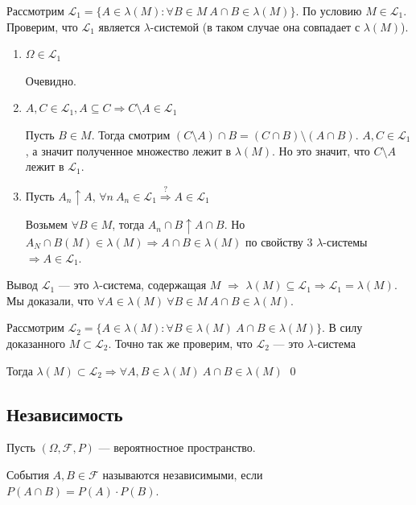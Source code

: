 Рассмотрим \( \mathcal{L}_1 = \{ A \in \lambda(M) : \forall B \in M \ A \cap B \in \lambda(M) \} \).
По условию \( M \in \mathcal{L}_1 \).
Проверим, что \( \mathcal{L}_1 \) является \( \lambda \)-системой
(в таком случае она совпадает с \( \lambda(M) \)).
\begin{enumerate}
    \item
        \( \Omega \in \mathcal{L}_1 \)

        Очевидно.
    \item
        \( A, C \in \mathcal{L}_1, A \subseteq C \Rightarrow C \setminus A \in \mathcal{L}_1 \)

        Пусть \( B \in M \).
        Тогда смотрим \( ( C \setminus A) \cap B = (C \cap B) \setminus (A \cap B) \).
        \( A, C \in \mathcal{L_1} \),
        а значит полученное множество лежит в \( \lambda(M) \).
        Но это значит, что \( C \setminus A \) лежит в \( \mathcal{L}_1 \).
    \item
        Пусть \( A_n \uparrow A \), \( \forall n \ A_n \in \mathcal{L_1} \overset{?}{\Rightarrow} A \in \mathcal{L}_1 \)

        Возьмем \( \forall B \in M \),
        тогда \( A_n \cap B \uparrow A \cap B \).
        Но \( A_N \cap B(M) \in \lambda(M) \Rightarrow A \cap B \in \lambda(M) \)
        по свойству \( 3 \) \( \lambda \)-системы \( \Rightarrow A \in \mathcal{L}_1 \).
\end{enumerate}

Вывод \( \mathcal{L}_1 \) --- это \( \lambda \)-система,
содержащая \( M \) \( \Rightarrow \) \( \lambda(M) \subseteq \mathcal{L}_1 \Rightarrow \mathcal{L}_1 = \lambda(M) \).
Мы доказали, что \( \forall A \in \lambda (M) \ \forall B \in M \ A \cap B \in \lambda(M) \).

Рассмотрим \( \mathcal{L}_2 = \{ A \in \lambda(M) : \forall B \in \lambda(M) \ A \cap B \in \lambda(M) \} \).
В силу доказанного \( M \subset \mathcal{L}_2 \). Точно так же проверим, что \( \mathcal{L}_2 \) --- это
\( \lambda \)-система


Тогда \( \lambda(M) \subset \mathcal{L}_2 \Rightarrow \forall A, B \in \lambda(M) \ A \cap B \in \lambda(M) \)
\qed

\subsection{Независимость}

Пусть \( ( \Omega, \mathcal{F}, P ) \) --- вероятностное пространство.

\begin{defn}{}{}
    События \( A, B \in \mathcal{F} \) называются независимыми,
    если \( P(A \cap B) = P(A) \cdot P(B) \).
\end{defn}

